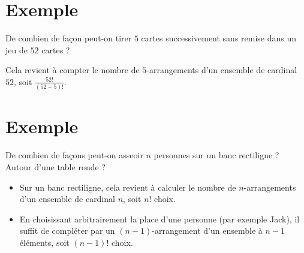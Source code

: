 \documentclass[../main.tex]{subfiles}
\begin{document}
\section{Exemple}
\begin{tcolorbox}[title=Exemple 31.32, title filled=false, colframe=darkgreen, colback=darkgreen!10!white]
    De combien de façon peut-on tirer $5$ cartes successivement sans remise dans un jeu de $52$ cartes ?
\end{tcolorbox}

\noindent Cela revient à compter le nombre de $5$-arrangements d'un ensemble de cardinal $52$, soit $\frac{52!}{(52-5)!}$. 

\section{Exemple}
\begin{tcolorbox}[title=Exemple 31.33, title filled=false, colframe=darkgreen, colback=darkgreen!10!white]
    De combien de façons peut-on asseoir $n$ personnes sur un banc rectiligne ? Autour d'une table ronde ?
\end{tcolorbox}

\begin{itemize}
    \item Sur un banc rectiligne, cela revient à calculer le nombre de $n$-arrangements d'un ensemble de cardinal $n$, soit $n!$ choix.
    \item En choisissant arbitrairement la place d'une personne (par exemple Jack), il suffit de compléter par un $(n-1)$-arrangement d'un ensemble à $n-1$ éléments, soit $(n-1)!$ choix. 
\end{itemize}
\end{document}
